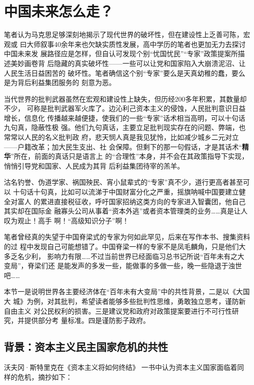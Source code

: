 \chapter{中国未来怎么走？}


笔者认为马克思足够深刻地揭示了现代世界的破坏性，但在建设性上乏善可陈，宏观或
曰大师叙事40余年来也欠缺实质性发展，高中学历的笔者也更加无力去探讨中国未来发
展路径应是怎样，但自认可发现个别“忧国忧民”“专家”政策提案所描述美妙画卷背
后隐藏的真实破坏性——一些可以让党和国家陷入大崩溃泥沼、让人民生活日益困苦的
破坏性。笔者确信这个别“专家”要么是天真幼稚的蠢，要么是为背后利益集团服务的
刻意为恶。

当代世界的批判武器虽然在宏观和建设性上缺失，但历经200多年积累，其数量却不少，
可称是批判武器军火库了。边沁利己资本主义的侵蚀，人民批判意识日益增长，信息化
传播越来越便捷，使我们的一些“专家”话术相当高明，可以十句话九句真，隐蔽性极
强。他们九句真话，主要立足批判现实存在的问题、弊端，也常常以人民的名义批判政
府，悲天悯人真是我见犹怜，比如减少城乡二元对立——户籍改革；加大民生支出、社
会保障。但剩下的那一句假话，才是其话术“\textbf{精华}”所在，前面的真话只是语言上
的“合理性”本身，并不会在其政策指导下实现，悄悄引导党和国家、人民成为其背
后利益集团待宰的羔羊。

沽名钓誉、伪道学家、祸国殃民、宵小鼠辈式的“专家”真不少，道行更高者甚至可以
十句话十句真，比如可以流涕于中国财富分化之严重，摇旗呐喊中国要建立健全对富人
的累进直接税征收，呼吁国家招纳这类方向的专家进入智囊团，他自己其实却在国际金
融寡头公司从事着“资本外逃”或者资本管理类的业务……真是让人叹为观止！高手
啊！“高级知识分子”啊！

笔者曾经真的失望于中国脊梁式的专家为何如此罕见，后来在写作本书、搜集资料的过
程中发现自己可能想错了。中国脊梁一样的专家不是凤毛麟角，只是他们大多乏名少利，
影响力有限……不过当前世界已经面临习总书记所说“百年未有之大变局”，脊梁们还
是能发声的多发一些，能做事的多做一些，晚一些隐退于浊世吧……

本节一是说明世界各主要经济体在“百年未有大变局”中的共性背景，二是以《大国大
城》为例，对其批判，希望读者能够多些批判性思维，勇敢独立思考，谨防新自由主义
对公民权利的损害。三是建议党和政府对政策提案要进行不可行性研究，并提供部分考
量标准。四是谨防影子政府。


\section{背景：资本主义民主国家危机的共性}



沃夫冈·斯特里克在《资本主义将如何终结》\cite{JJDK201504024}\cite{streeck2017will}
一书中认为资本主义国家面临着同样的危机，摘抄如下：

